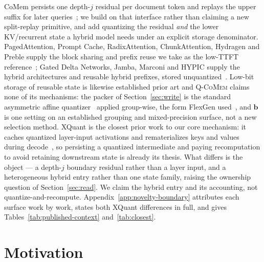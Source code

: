 \documentclass{article}
\newcommand{\qcomem}{\textsc{Q-CoMem}}
\begin{document}
CoMem persists one depth-$j$ residual per document token and replays the upper
suffix for later queries~\citep{liu2026comem,liu2026understanding}; we build on
that interface rather than claiming a new split-replay primitive, and add
quantizing the residual \emph{and} the lower KV/recurrent state a hybrid model
needs under an explicit storage denominator.  PagedAttention, Prompt Cache,
RadixAttention, ChunkAttention, Hydragen and Preble supply the block sharing and
prefix reuse we take as the low-TTFT
reference~\citep{kwon2023pagedattention,gim2024promptcache,zheng2024sglang,
ye2024chunkattention,juravsky2024hydragen,srivatsa2025preble}; Gated Delta
Networks, Jamba, Marconi and HYPIC supply the hybrid architectures and reusable
hybrid prefixes, stored
unquantized~\citep{yang2025gateddeltanet,lieber2025jamba,pan2025marconi,liu2026hypic}.
Low-bit storage of reusable state is likewise
established prior art and \qcomem{} claims none of its mechanisms: the packer of
Section~\ref{sec:write} is the standard asymmetric affine
quantizer~\citep{jacob2018quantization} applied group-wise, the form FlexGen
used~\citep{sheng2023flexgen}, and $\mathbf b$ is one setting on an established
grouping and mixed-precision surface, not a new selection method.
XQuant is the closest prior work to our core mechanism: it caches quantized
layer-input activations and rematerializes keys and values during
decode~\citep{tomar2025xquant}, so persisting a quantized intermediate and paying
recomputation to avoid retaining downstream state is already its thesis.  What
differs is the object --- a depth-$j$ boundary residual rather than a layer
input, and a heterogeneous hybrid entry rather than one state family, raising the
ownership question of Section~\ref{sec:read}.  We claim the hybrid entry and its
accounting, not quantize-and-recompute.
Appendix~\ref{app:novelty-boundary} attributes each surface work by work, states
both XQuant differences in full, and gives
Tables~\ref{tab:published-context} and~\ref{tab:closest}.

\section{Motivation}
\label{sec:motivation}
\end{document}
